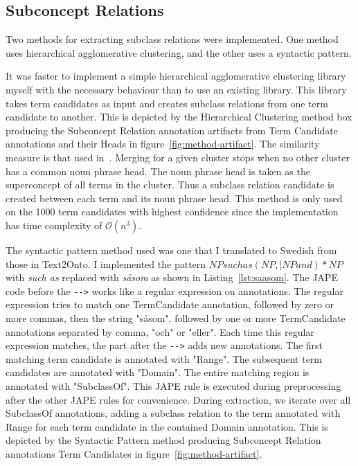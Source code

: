 \documentclass[a4paper]{report}
\begin{document}
\subsection{Subconcept Relations}

Two methods for extracting subclass relations were implemented.
One method uses hierarchical agglomerative clustering, and the other uses a syntactic pattern.

It was faster to implement a simple hierarchical agglomerative clustering library myself with the necessary behaviour than to use an existing library.
This library takes term candidates as input and creates subclass relations from one term candidate to another.
This is depicted by the Hierarchical Clustering method box producing the Subconcept Relation annotation artifacts from Term Candidate annotations and their Heads in figure~\ref{fig:method-artifact}.
The similarity measure is that used in~\cite{Drymonas10OntoGain}.
Merging for a given cluster stops when no other cluster has a common noun phrase head.
The noun phrase head is taken as the superconcept of all terms in the cluster.
Thus a subclass relation candidate is created between each term and its noun phrase head.
This method is only used on the 1000 term candidates with highest confidence since the implementation has time complexity of \(\mathcal{O}(n^{3})\).

The syntactic pattern method used was one that I translated to Swedish from those in Text2Onto\cite{Cimiano2005Text2Onto}.
I implemented the pattern \(NP such as (NP, |NP and)* NP\) with \emph{such as} replaced with \emph{såsom} as shown in Listing~\ref{lst:saasom}.
The JAPE code before the \verb+-->+ works like a regular expression on annotations.
The regular expression tries to match one TermCandidate annotation, followed by zero or more commas, then the string "såsom", followed by one or more TermCandidate annotations separated by comma, "och" or "eller".
Each time this regular expression matches, the part after the \verb+-->+ adds new annotations.
The first matching term candidate is annotated with "Range".
The subsequent term candidates are annotated with "Domain".
The entire matching region is annotated with "SubclassOf".
This JAPE rule is executed during preprocessing after the other JAPE rules for convenience.
During extraction, we iterate over all SubclassOf annotations, adding a subclass relation to the term annotated with Range for each term candidate in the contained Domain annotation.
This is depicted by the Syntactic Pattern method producing Subconcept Relation annotations Term Candidates in figure~\ref{fig:method-artifact}.
\end{document}
